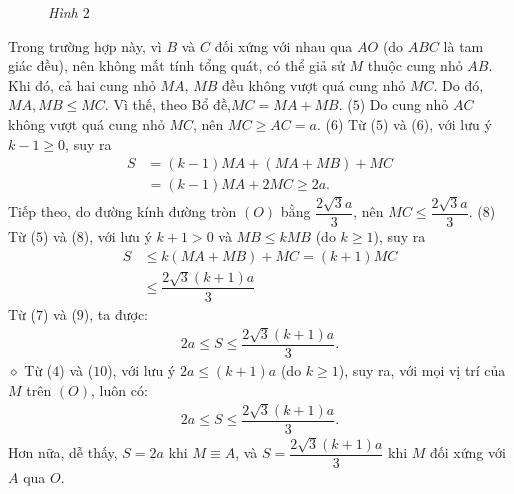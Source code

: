 \begin{multicols}{2}
\begin{figure}[H]
		\caption{\small\textit{\color{thachthuctoanhoc}Hình $2$}}
		\vspace*{-15pt}
	\end{figure}
	Trong trường hợp này, vì $B$ và $C$ đối xứng với nhau qua $AO$ (do $ABC$ là tam giác đều), nên không mất tính tổng quát, có thể giả sử $M$ thuộc cung nhỏ $AB$.
	\vskip 0.05cm
	Khi đó, cả hai cung nhỏ $MA$, $MB$ đều không vượt quá cung nhỏ $MC$. Do đó, $MA, MB \le MC$. Vì thế, theo Bổ đề,\linebreak $MC = MA + MB.$ \hfill ($5$)
	\vskip 0.05cm
	Do cung nhỏ $AC$ không vượt quá cung nhỏ $MC$, nên $MC \ge AC = a$. \hfill ($6$)
	\vskip 0.05cm
	Từ ($5$) và ($6$), với lưu ý $k - 1 \ge 0$, suy ra
	\begin{align*}
		S &= (k - 1)MA + (MA + MB) + MC \\
		&= (k - 1)MA + 2MC \ge 2a.                      \tag{$7$}
	\end{align*}
	Tiếp theo, do đường kính đường tròn $(O)$ bằng $\dfrac{2\sqrt{3}a}{3}$, nên  $MC \le \dfrac{2\sqrt{3}a}{3}$. \hfill ($8$)
	\vskip 0.05cm
	Từ ($5$) và ($8$), với lưu ý $k + 1 > 0$ và $MB \le kMB$ (do $k \ge 1$), suy ra
	\begin{align*}
		S &\le k\left( {MA + MB} \right) + MC = \left( {k + 1} \right)MC \\
		&\le \dfrac{{2\sqrt 3 \left( {k + 1} \right)a}}{3} \tag{$9$}
	\end{align*}
	Từ ($7$) và ($9$), ta được:
	\begin{align*}
		2a \le S \le \dfrac{{2\sqrt 3 \left( {k + 1} \right)a}}{3}. \tag{$10$}
	\end{align*}
	$\diamond$ Từ ($4$) và ($10$), với lưu ý $2a \le (k + 1)a$ (do $k \ge 1$), suy ra, với mọi vị trí của $M$ trên $(O)$, luôn có:
	\begin{align*}
		2a \le S \le \dfrac{{2\sqrt 3 \left( {k + 1} \right)a}}{3}. 
	\end{align*}
	Hơn nữa, dễ thấy, $S = 2a$ khi $M \equiv A$, và $S = \dfrac{{2\sqrt 3 \left( {k + 1} \right)a}}{3}$  khi $M$ đối xứng với $A$ qua $O$.

\end{multicols}
